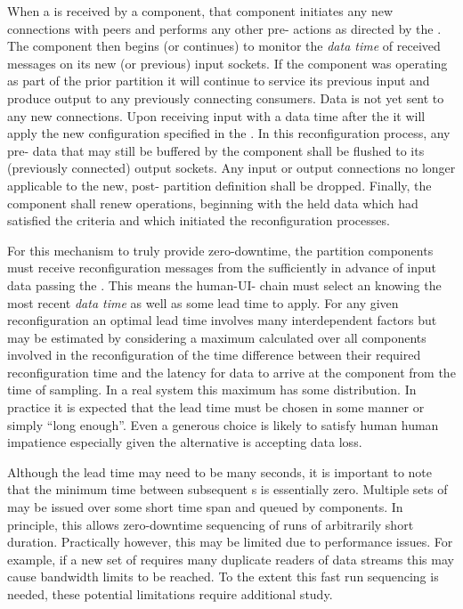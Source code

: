 When a  is received by a component, that component initiates any new connections with peers and performs any other pre- actions as directed by the . 
The component then begins (or continues) to monitor the \textit{data time} of received messages on its new (or previous) input sockets. 
If the component was operating as part of the prior partition it will continue to service its previous input and produce output to any previously connecting consumers.
Data is not yet sent to any new connections.
Upon receiving input with a data time after the  it will apply the new configuration specified in the . 
In this reconfiguration process, any pre- data that may still be buffered by the component shall be flushed to its (previously connected) output sockets. 
Any input or output connections no longer applicable to the new, post- partition definition shall be dropped. 
Finally, the component shall renew operations, beginning with the held data which had satisfied the  criteria and which initiated the reconfiguration processes.

For this mechanism to truly provide zero-downtime, the partition components must receive reconfiguration messages from the  sufficiently in advance of input data passing the .
This means the human-UI- chain must select an  knowing the most recent \textit{data time} as well as some lead time to apply.  
For any given reconfiguration an optimal lead time involves many interdependent factors but may be estimated by considering a maximum calculated over all components involved in the reconfiguration of the time difference between their required reconfiguration time and the latency for data to arrive at the component from the time of sampling. 
In a real system this maximum has some distribution. 
In practice it is expected that the lead time must be chosen in some %
manner or simply ``long enough''.
Even a generous choice is likely to satisfy human human impatience especially given the alternative is accepting data loss.

Although the lead time may need to be many seconds, it is important to note that the minimum time between subsequent s is essentially zero. 
Multiple sets of  may be issued over some short time span and queued by components. 
In principle, this allows zero-downtime sequencing of runs of arbitrarily short duration.
Practically however, this may be limited due to performance issues. 
For example, if a new set of  requires many duplicate readers of data streams this may cause bandwidth limits to be reached. 
To the extent this fast run sequencing is needed, these potential limitations require additional study.

